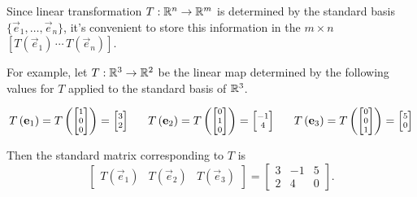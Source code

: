 \begin{definition}
Since linear transformation \(T:\IR^n\to\IR^m\) is determined by
the standard basis \(\{\vec e_1,\dots,\vec e_n\}\), it's convenient to
store this information in the \(m\times n\) 
\([T(\vec e_1) \,\cdots\, T(\vec e_n)]\).

\vspace{1em}

For example,
let \(T: \IR^3 \rightarrow \IR^2\) be the linear map determined by
the following values for \(T\) applied to the standard basis of \(\IR^3\).

\[\scriptsize
  T\left(\vec e_1 \right)
=
  T\left(\begin{bmatrix} 1 \\ 0 \\ 0 \end{bmatrix} \right)
=
  \begin{bmatrix} 3 \\ 2\end{bmatrix}
\hspace{2em}
  T\left(\vec e_2 \right)
=
  T\left(\begin{bmatrix} 0 \\ 1 \\ 0 \end{bmatrix} \right)
=
  \begin{bmatrix} -1 \\ 4\end{bmatrix}
\hspace{2em}
  T\left(\vec e_3 \right)
=
  T\left(\begin{bmatrix} 0 \\ 0 \\ 1 \end{bmatrix} \right)
=
  \begin{bmatrix} 5 \\ 0\end{bmatrix}
\]

Then the standard matrix corresponding to \(T\) is
\[
  \begin{bmatrix}T(\vec e_1) & T(\vec e_2) & T(\vec e_3)\end{bmatrix}
=
  \begin{bmatrix}3 & -1 & 5 \\ 2 & 4 & 0 \end{bmatrix}
.\]
\end{definition}

